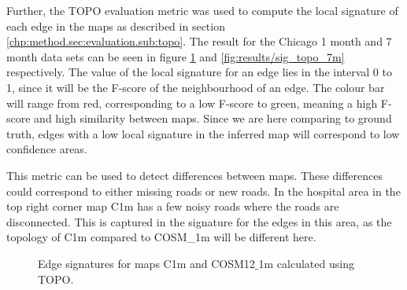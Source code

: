 Further, the TOPO evaluation metric was used to compute the local signature of each edge in the maps as described in section \ref{chp:method.sec:evaluation.sub:topo}. The result for the Chicago 1 month and 7 month data sets can be seen in figure \ref{fig:results/sig_topo_1m} and \ref{fig:results/sig_topo_7m} respectively. The value of the local signature for an edge lies in the interval 0 to 1, since it will be the F-score of the neighbourhood of an edge. The colour bar will range from red, corresponding to a low F-score to green, meaning a high F-score and high similarity between maps. Since we are here comparing to ground truth, edges with a low local signature in the inferred map will correspond to low confidence areas.

This metric can be used to detect differences between maps. These differences could correspond to either missing roads or new roads. In the hospital area in the top right corner map C1m has a few noisy roads where the roads are disconnected. This is captured in the signature for the edges in this area, as the topology of C1m compared to COSM\_1m will be different here.

\begin{figure}[H]%

 
  
 \caption{Edge signatures for maps C1m and COSM12$\_$1m calculated using TOPO.}%
 \label{fig:results/sig_topo_1m}
\end{figure}

